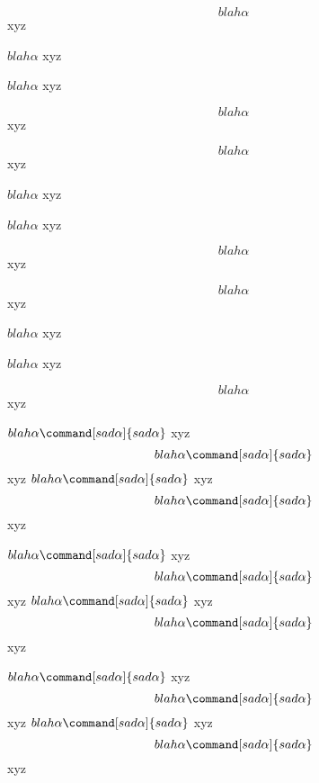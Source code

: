 % 
% 

{
\[blah \alpha\] xyz \par
\(blah \alpha\) xyz \par
$blah \alpha$ xyz \par
$$blah \alpha$$ xyz \par

\[blah \alpha \] xyz \par
\(blah \alpha \) xyz \par
$blah \alpha $ xyz \par
$$blah \alpha $$ xyz \par

\[ blah \alpha\] xyz \par
\( blah \alpha\) xyz \par
$ blah \alpha$ xyz \par
$$ blah \alpha$$ xyz \par

\(blah \alpha \command[sad\alpha]{sad\alpha}\) xyz
\[blah \alpha \command[sad\alpha]{sad\alpha}\] xyz
$blah \alpha \command[sad\alpha]{sad\alpha}$ xyz
$$blah \alpha \command[sad\alpha]{sad\alpha}$$ xyz

\(blah \alpha \command[sad\alpha]{sad\alpha} \) xyz
\[blah \alpha \command[sad\alpha]{sad\alpha} \] xyz
$blah \alpha \command[sad\alpha]{sad\alpha} $ xyz
$$blah \alpha \command[sad\alpha]{sad\alpha} $$ xyz

\( blah \alpha\command[sad\alpha]{sad\alpha} \) xyz
\[ blah \alpha\command[sad\alpha]{sad\alpha} \] xyz
$ blah \alpha\command[sad\alpha]{sad\alpha} $ xyz
$$ blah \alpha\command[sad\alpha]{sad\alpha} $$ xyz
}

